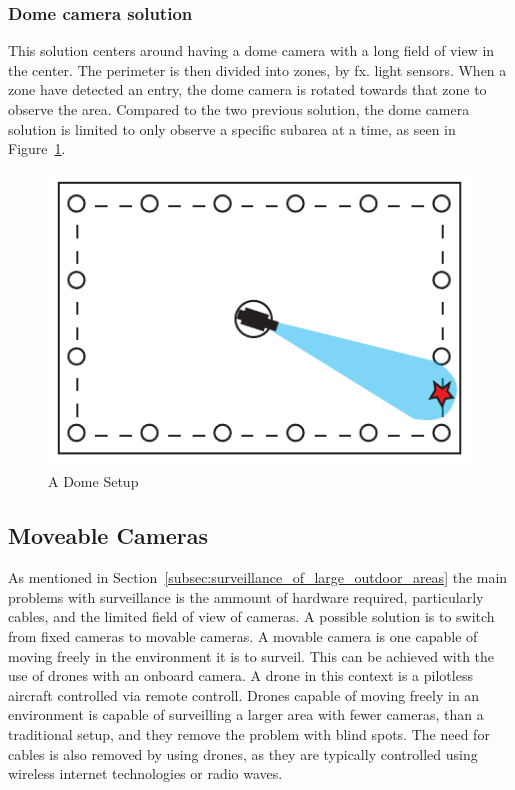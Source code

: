 \subsubsection{Dome camera solution}
This solution centers around having a dome camera with a long field of view in the center.
The perimeter is then divided into zones, by fx. light sensors.
When a zone have detected an entry, the dome camera is rotated towards that zone to observe the area.
Compared to the two previous solution, the dome camera solution is limited to only observe a specific subarea at a time, as seen in Figure~\ref{fig:drone_sensor}.
\begin{figure}[htb]
    \centering
    \includegraphics[width=\textwidth]{gfx/drome_sensor.pdf}
    \caption{A Dome Setup}
    \label{fig:drone_sensor}
\end{figure}

\subsection{Moveable Cameras}
As mentioned in Section~\ref{subsec:surveillance_of_large_outdoor_areas} the main problems with surveillance is the ammount of hardware required, particularly cables, and the limited field of view of cameras.
A possible solution is to switch from fixed cameras to movable cameras.
A movable camera is one capable of moving freely in the environment it is to surveil.
This can be achieved with the use of drones with an onboard camera.
A drone in this context is a pilotless aircraft controlled via remote controll.
Drones capable of moving freely in an environment is capable of surveilling a larger area with fewer cameras, than a traditional setup, and they remove the problem with blind spots.
The need for cables is also removed by using drones, as they are typically controlled using wireless internet technologies or radio waves.

